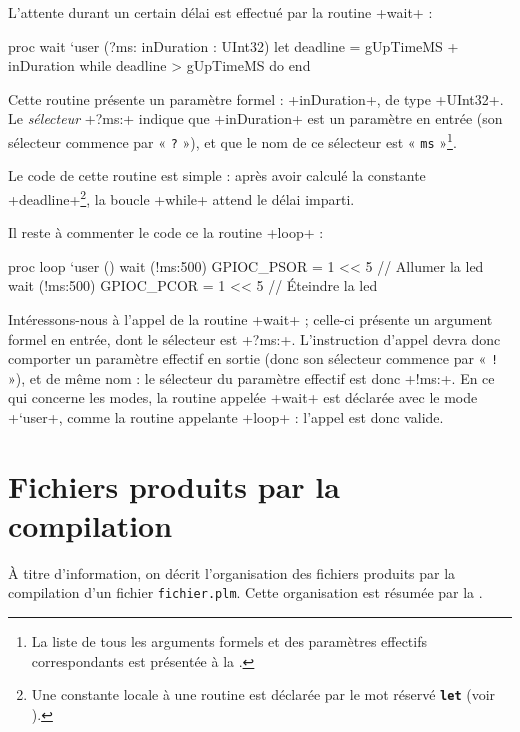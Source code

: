 L'attente durant un certain délai est effectué par la routine \plm+wait+ :
\begin{PLM}[17]
proc wait `user (?ms: inDuration : UInt32) {
  let deadline = gUpTimeMS + inDuration
  while deadline > gUpTimeMS do
  end
}
\end{PLM}

Cette routine présente un paramètre formel : \plm+inDuration+, de type \plm+UInt32+. Le \emph{sélecteur} \plm+?ms:+ indique que \plm+inDuration+ est un paramètre en entrée (son sélecteur commence par « \texttt{?} »), et que le nom de ce sélecteur est « \texttt{ms} »\footnote{La liste de tous les arguments formels et des paramètres effectifs correspondants est présentée à la .}.

Le code de cette routine est simple : après avoir calculé la constante \plm+deadline+\footnote{Une constante locale à une routine est déclarée par le mot réservé \texttt{\bfseries let} (voir ).}, la boucle \plm+while+ attend le délai imparti.

Il reste à commenter le code ce la routine \plm+loop+ :
\begin{PLM}[23]
proc loop `user () {
  wait (!ms:500)
  GPIOC_PSOR = 1 << 5 // Allumer la led
  wait (!ms:500)
  GPIOC_PCOR = 1 << 5  // Éteindre la led
}
\end{PLM}

Intéressons-nous à l'appel de la routine \plm+wait+ ; celle-ci présente un argument formel en entrée, dont le sélecteur est \plm+?ms:+. L'instruction d'appel devra donc comporter un paramètre effectif en sortie (donc son sélecteur commence par « \texttt{!} »), et de même nom : le sélecteur du paramètre effectif est donc \plm+!ms:+. En ce qui concerne les modes, la routine appelée \plm+wait+ est déclarée avec le mode \plm+`user+, comme la routine appelante \plm+loop+ : l'appel est donc valide.



\section{Fichiers produits par la compilation}

À titre d'information, on décrit l'organisation des fichiers produits par la compilation d'un fichier \texttt{f{}ichier.plm}. Cette organisation est résumée par la .

